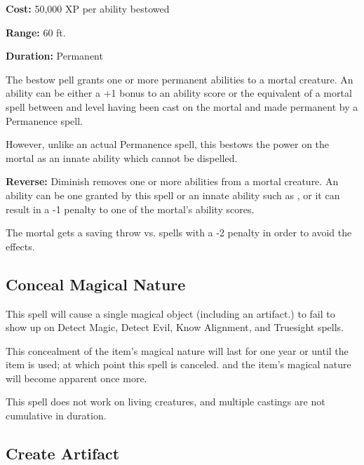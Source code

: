 \begin{multicols*}{2}
{\textbf{Cost:} 50,000 XP per ability bestowed

\textbf{Range:} 60 ft.

\textbf{Duration:} Permanent}

The bestow pell grants one or more permanent abilities to a mortal creature. An ability can be either a +1 bonus to an ability score or the equivalent of a mortal spell between  and  level having been cast on the mortal and made permanent by a Permanence spell.

However, unlike an actual Permanence spell, this bestows the power on the mortal as an innate ability which cannot be dispelled.

\textbf{Reverse:} Diminish removes one or more abilities from a mortal creature. An ability can be one granted by this spell or an innate ability such as , or it can result in a -1 penalty to one of the mortal’s ability scores.

The mortal gets a saving throw vs. spells with a -2 penalty in order to avoid the effects.

\subsection{Conceal Magical Nature}

This spell will cause a single magical object (including an artifact.) to fail to show up on Detect Magic, Detect Evil, Know Alignment, and Truesight spells.

This concealment of the item’s magical nature will last for one year or until the item is used; at which point this spell is canceled. and the item’s magical nature will become apparent once more.

This spell does not work on living creatures, and multiple castings are not cumulative in duration.

\subsection{Create Artifact}
\end{multicols*}
